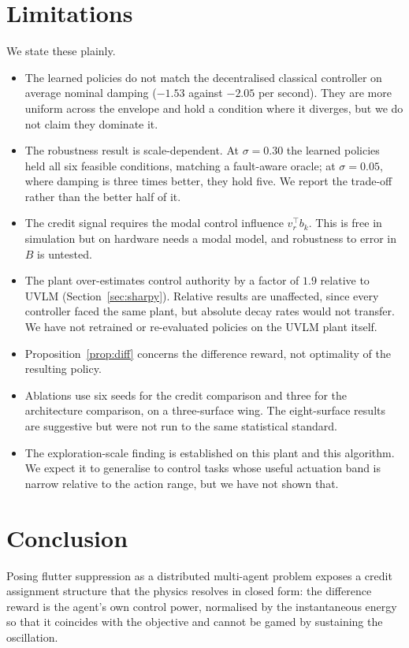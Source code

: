 \documentclass[11pt,a4paper]{article}
\begin{document}
\section{Limitations}

We state these plainly.

\begin{itemize}
\item The learned policies do not match the decentralised classical controller
on average nominal damping ($-1.53$ against $-2.05$ per second). They are more
uniform across the envelope and hold a condition where it diverges, but we do not
claim they dominate it.
\item The robustness result is scale-dependent. At $\sigma=0.30$ the learned
policies held all six feasible conditions, matching a fault-aware oracle; at
$\sigma=0.05$, where damping is three times better, they hold five. We report the
trade-off rather than the better half of it.
\item The credit signal requires the modal control influence $v_r^{\top} b_k$.
This is free in simulation but on hardware needs a modal model, and robustness to
error in $B$ is untested.
\item The plant over-estimates control authority by a factor of $1.9$ relative to
UVLM (Section~\ref{sec:sharpy}). Relative results are unaffected, since every
controller faced the same plant, but absolute decay rates would not transfer. We
have not retrained or re-evaluated policies on the UVLM plant itself.
\item Proposition~\ref{prop:diff} concerns the difference reward, not optimality
of the resulting policy.
\item Ablations use six seeds for the credit comparison and three for the
architecture comparison, on a three-surface wing. The eight-surface results are
suggestive but were not run to the same statistical standard.
\item The exploration-scale finding is established on this plant and this
algorithm. We expect it to generalise to control tasks whose useful actuation
band is narrow relative to the action range, but we have not shown that.
\end{itemize}

\section{Conclusion}

Posing flutter suppression as a distributed multi-agent problem exposes a credit
assignment structure that the physics resolves in closed form: the difference
reward is the agent's own control power, normalised by the instantaneous energy so
that it coincides with the objective and cannot be gamed by sustaining the
oscillation. \ConclusionSentence



\end{document}
